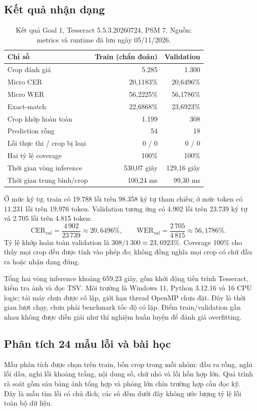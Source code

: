 \documentclass[11pt,a4paper]{article}
\begin{document}
\subsection{Kết quả nhận dạng}
\begin{table}[H]
\caption{Kết quả Goal 1, Tesseract 5.5.3.20260724, PSM 7. Nguồn: metrics và runtime đã lưu ngày 05/11/2026.}
\begin{tabularx}{\linewidth}{@{}Yrr@{}}
\toprule
\textbf{Chỉ số} & \textbf{Train (chẩn đoán)} & \textbf{Validation}\\\midrule
Crop đánh giá & 5.285 & 1.300\\
Micro CER & 20,1183\% & 20,6496\%\\
Micro WER & 56,2225\% & 56,1786\%\\
Exact-match & 22,6868\% & 23,6923\%\\
Crop khớp hoàn toàn & 1.199 & 308\\
Prediction rỗng & 54 & 18\\
Lỗi thực thi / crop bị loại & 0 / 0 & 0 / 0\\
Hai tỷ lệ coverage & 100\% & 100\%\\
Thời gian vòng inference & 530,07 giây & 129,16 giây\\
Thời gian trung bình/crop & 100,24 ms & 99,30 ms\\
\bottomrule
\end{tabularx}
\end{table}

Ở mức ký tự, train có 19.788 lỗi trên 98.358 ký tự tham chiếu; ở mức token có 11.231 lỗi trên 19.976 token. Validation tương ứng có 4.902 lỗi trên 23.739 ký tự và 2.705 lỗi trên 4.815 token:
\[
\mathrm{CER}_{val}=\frac{4\,902}{23\,739}\approx20{,}6496\%,\qquad
\mathrm{WER}_{val}=\frac{2\,705}{4\,815}\approx56{,}1786\%.
\]
Tỷ lệ khớp hoàn toàn validation là $308/1\,300\approx23{,}6923\%$. Coverage 100\% cho thấy mọi crop đều được tính vào phép đo; không đồng nghĩa mọi crop có chữ đầu ra hoặc nhận dạng đúng.

Tổng hai vòng inference khoảng 659,23 giây, gồm khởi động tiến trình Tesseract, kiểm tra ảnh và đọc TSV. Môi trường là Windows 11, Python 3.12.16 và 16 CPU logic; tải máy chưa được cô lập, giới hạn thread OpenMP chưa đặt. Đây là thời gian lượt chạy, chưa phải benchmark tốc độ có lặp. Điểm train/validation gần nhau không được diễn giải như thí nghiệm huấn luyện để đánh giá overfitting.

\clearpage
\subsection{Phân tích 24 mẫu lỗi và bài học}
Mẫu phân tích được chọn trên train, bốn crop trong mỗi nhóm: đầu ra rỗng, nghi lỗi dấu, nghi lỗi khoảng trắng, nội dung số, chữ nhỏ và lỗi hỗn hợp lớn. Quá trình rà soát gồm sáu bảng ảnh tổng hợp và phóng lớn chín trường hợp cần đọc kỹ. Đây là mẫu tìm lỗi có chủ đích; các số đếm dưới đây không ước lượng tỷ lệ lỗi toàn bộ dữ liệu.
\end{document}

